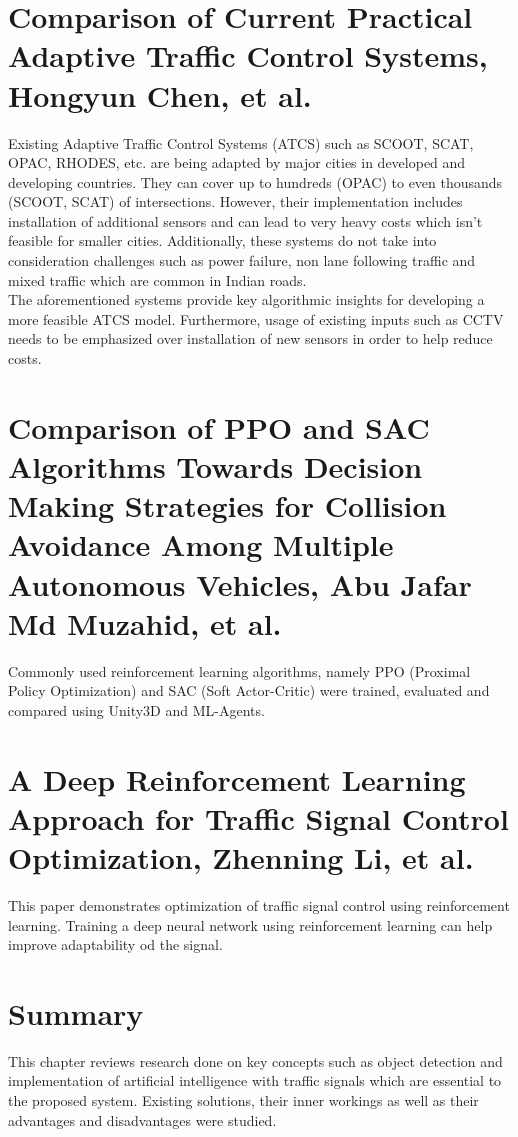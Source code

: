\documentclass[openany,12pt]{report}
\begin{document}
	\section{Comparison of Current Practical Adaptive Traffic Control Systems, Hongyun Chen, et al. \cite{paper4}}
	\hspace*{0.5in}Existing Adaptive Traffic Control Systems (ATCS) such as SCOOT, SCAT, OPAC, RHODES, etc. are being adapted by major cities in developed and developing countries. They can cover up to hundreds (OPAC) to even thousands (SCOOT, SCAT) of intersections. However, their implementation includes installation of additional sensors and can lead to very heavy costs which isn't feasible for smaller cities. Additionally, these systems do not take into consideration challenges such as power failure, non lane following traffic and mixed traffic which are common in Indian roads.\\
	\hspace*{0.5in}The aforementioned systems provide key algorithmic insights for developing a more feasible ATCS model. Furthermore, usage of existing inputs such as CCTV needs to be emphasized over installation of new sensors in order to help reduce costs.\\
	
	\section{Comparison of PPO and SAC Algorithms Towards Decision Making Strategies for Collision Avoidance Among Multiple Autonomous Vehicles, Abu Jafar Md Muzahid, et al.\cite{paper7}}
	\hspace*{0.5 in}Commonly used reinforcement learning algorithms, namely  PPO (Proximal Policy Optimization) and SAC (Soft Actor-Critic) were trained, evaluated and compared using Unity3D and ML-Agents.
	
	\section{A Deep Reinforcement Learning Approach for Traffic Signal Control Optimization, Zhenning Li, et al. \cite{paper8}}
	\hspace*{0.5 in} This paper demonstrates optimization of traffic signal control using reinforcement learning. Training a deep neural network using reinforcement learning can help improve adaptability od the signal.
	
	\section{Summary}
	\hspace*{0.5in}This chapter reviews research done on key concepts such as object detection and implementation of artificial intelligence with traffic signals which are essential to the proposed system. Existing solutions, their inner workings as well as their advantages and disadvantages were studied.\\
	
\end{document}
